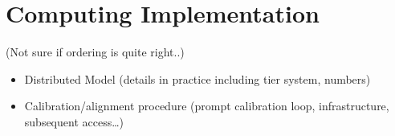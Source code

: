 \documentclass [draft,notitlepage] {article}
\begin{document}
\section{Computing Implementation} 
(Not sure if ordering is quite right..)


\begin{itemize}

\item Distributed Model (details in practice including tier system, numbers)





\item Calibration/alignment procedure (prompt calibration loop,
  infrastructure, subsequent access\ldots)





\end{itemize}
\end{document}
